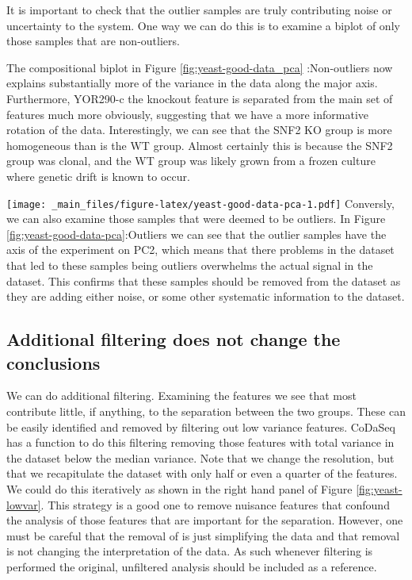 \documentclass[onecolumn]{article}
\begin{document}
It is important to check that the outlier samples are truly contributing noise or uncertainty to the system. One way we can do this is to examine a biplot of only those samples that are non-outliers.

The compositional biplot in Figure \ref{fig:yeast-good-data_pca} :Non-outliers now explains substantially more of the variance in the data along the major axis. Furthermore, YOR290-c the knockout feature is separated from the main set of features much more obviously, suggesting that we have a more informative rotation of the data. Interestingly, we can see that the SNF2 KO group is more homogeneous than is the WT group. Almost certainly this is because the SNF2 group was clonal, and the WT group was likely grown from a frozen culture where genetic drift is known to occur.

\texttt{[image: \_main\_files/figure-latex/yeast-good-data-pca-1.pdf]}
Conversly, we can also examine those samples that were deemed to be outliers. In Figure \ref{fig:yeast-good-data-pca}:Outliers we can see that the outlier samples have the axis of the experiment on PC2, which means that there problems in the dataset that led to these samples being outliers overwhelms the actual signal in the dataset. This confirms that these samples should be removed from the dataset as they are adding either noise, or some other systematic information to the dataset.

\clearpage

\hypertarget{additional-filtering-does-not-change-the-conclusions}{%
\subsection{Additional filtering does not change the conclusions}\label{additional-filtering-does-not-change-the-conclusions}}

We can do additional filtering. Examining the features we see that most contribute little, if anything, to the separation between the two groups. These can be easily identified and removed by filtering out low variance features. CoDaSeq has a function to do this filtering removing those features with total variance in the dataset below the median variance. Note that we change the resolution, but that we recapitulate the dataset with only half or even a quarter of the features. We could do this iteratively as shown in the right hand panel of Figure \ref{fig:yeast-lowvar}. This strategy is a good one to remove nuisance features that confound the analysis of those features that are important for the separation. However, one must be careful that the removal of is just simplifying the data and that removal is not changing the interpretation of the data. As such whenever filtering is performed the original, unfiltered analysis should be included as a reference.
\end{document}
